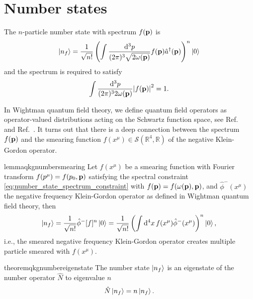 \section{Number states}

\begin{definition}\label{def:qkg_number_state}
	The $n$-particle number state with spectrum $f(\vb{p})$ is
	\begin{equation}
		\ket{n_f}
		=
		\frac{1}{\sqrt{n!}}
		\left(
			\int\frac{\dd[3]{p}}{(2\pi)^3\sqrt{2\omega(\vb{p})}}
			f(\vb{p})
			\hat{a}^\dagger(\vb{p})
		\right)^n
		\ket{0}
		\label{eq:qkg_number_state}
	\end{equation}
	and the spectrum is required to satisfy
	\begin{equation}
		\int\frac{\dd[3]{p}}{(2\pi)^32\omega(\vb{p})}
		\abs{f(\vb{p})}^2
		=
		1
		\label{eq:number_state_spectrum_constraint}
		.
	\end{equation}
\end{definition}
In Wightman quantum field theory, we define quantum field operators as operator-valued distributions acting on the Schwartz function space, see Ref.~\cite{Bogolubov1989} and Ref.~\cite{Streater2016}.
It turns out that there is a deep connection between the spectrum $f(\vb{p})$ and the smearing function $f(x^\mu)\in\mathcal{S}(\mathbb{R}^4,\mathbb{R})$ of the negative Klein-Gordon operator.
\begin{restatable}{lemma}{qkgnumbersmearing}\label{thm:qkg_number_state_smearing}
	Let $f(x^\mu)$ be a smearing function with Fourier transform $f(p^\mu)=f(p_0,\vb{p})$ satisfying the spectral constraint \cref{eq:number_state_spectrum_constraint} with $f(\vb{p})=f(\omega(\vb{p}),\vb{p})$, and $\hat\phi^-(x^\mu)$ the negative frequency Klein-Gordon operator as defined in Wightman quantum field theory, then
	\begin{equation}
		\ket{n_f}
		=
		\frac{1}{\sqrt{n!}}
		\hat\phi^-[f]^n
		\ket{0}
		=
		\frac{1}{\sqrt{n!}}
		\left(
			\int\dd[4]{x}
			f(x^\mu)
			\hat\phi^-(x^\mu)
		\right)^n
		\ket{0}
		\label{eq:qkg_number_state_smearing}
		,
	\end{equation}
	i.e., the smeared negative frequency Klein-Gordon operator creates multiple particle smeared with $f(x^\mu)$.
\end{restatable}
\begin{restatable}{theorem}{qkgnumbereigenstate}\label{thm:qkg_number_state_eigenstate}
	The number state $\ket{n_f}$ is an eigenstate of the number operator $\hat{N}$ to eigenvalue $n$
	\begin{equation}
		\hat{N}
		\ket{n_f}
		=
		n
		\ket{n_f}
		.
	\end{equation}
\end{restatable}
